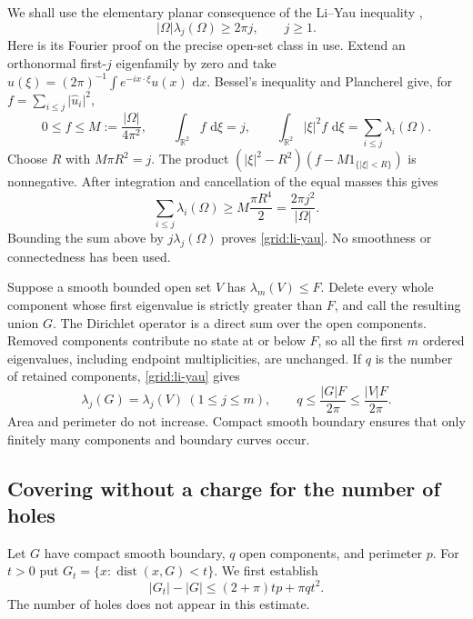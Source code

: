\documentclass[11pt,reqno]{amsart}
\numberwithin{equation}{section}
\newcommand{\R}{\mathbb R}
\newcommand{\dd}{\,\mathrm d}
\newcommand{\abs}[1]{\lvert#1\rvert}
\newcommand{\Om}{\Omega}
\begin{document}
We shall use the elementary planar consequence of the Li--Yau
inequality \cite{LiYau1983},
\begin{equation}
 \abs{\Om}\lambda_j(\Om)\ge2\pi j,
 \qquad j\ge1.
 \label{grid:li-yau}
\end{equation}
Here is its Fourier proof on the precise open-set class in use.
Extend an orthonormal first-\(j\) eigenfamily by zero and take
\(\widehat u(\xi)=(2\pi)^{-1}\int e^{-ix\cdot\xi}u(x)\,\dd x\).
Bessel's inequality and Plancherel give, for
\(f=\sum_{i\le j}\abs{\widehat u_i}^2\),
\[
 0\le f\le M:=\frac{\abs{\Om}}{4\pi^2},\qquad
 \int_{\R^2}f\,\dd\xi=j,\qquad
 \int_{\R^2}\abs\xi^2f\,\dd\xi=\sum_{i\le j}\lambda_i(\Om).
\]
Choose \(R\) with \(M\pi R^2=j\).
The product
\((\abs\xi^2-R^2)(f-M1_{\{\abs\xi<R\}})\) is nonnegative.
After integration and cancellation of the equal masses this gives
\[
 \sum_{i\le j}\lambda_i(\Om)
 \ge M\frac{\pi R^4}{2}
 =\frac{2\pi j^2}{\abs{\Om}}.
\]
Bounding the sum above by \(j\lambda_j(\Om)\) proves
\eqref{grid:li-yau}.  No smoothness or connectedness has been used.

Suppose a smooth bounded open set \(V\) has
\(\lambda_m(V)\le F\).  Delete every whole component whose first
eigenvalue is strictly greater than \(F\), and call the resulting
union \(G\).  The Dirichlet operator is a direct sum over the open
components.  Removed components contribute no state at or below
\(F\), so all the first \(m\) ordered eigenvalues, including endpoint
multiplicities, are unchanged.  If \(q\) is the number of retained
components, \eqref{grid:li-yau} gives
\begin{equation}
 \lambda_j(G)=\lambda_j(V)\ (1\le j\le m),\qquad
 q\le\frac{\abs G F}{2\pi}\le\frac{\abs V F}{2\pi}.
 \label{grid:active-components}
\end{equation}
Area and perimeter do not increase.  Compact smooth boundary ensures
that only finitely many components and boundary curves occur.

\subsection{Covering without a charge for the number of holes}
\label{grid:hole-cover}

Let \(G\) have compact smooth boundary, \(q\) open components, and
perimeter \(p\).  For \(t>0\) put
\(G_t=\{x:\operatorname{dist}(x,G)<t\}\).
We first establish
\begin{equation}
 \abs{G_t}-\abs G\le(2+\pi)tp+\pi qt^2.
 \label{grid:tube}
\end{equation}
The number of holes does not appear in this estimate.
\end{document}
